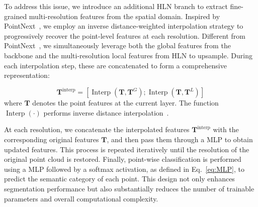 To address this issue, we introduce an additional HLN branch to extract fine-grained multi-resolution features from the spatial domain. Inspired by PointNext~\cite{qian2022pointnext}, we employ an inverse distance-weighted interpolation strategy to progressively recover the point-level features at each resolution. Different from PointNext~\cite{qian2022pointnext}, we simultaneously leverage both the global features from the backbone and the multi-resolution local features from HLN to upsample. During each interpolation step, these are concatenated to form a comprehensive representation:

\begin{equation}
\mathbf{T}^{\text{interp}} = [\operatorname{Interp}(\mathbf{T}, \mathbf{T}^G); \operatorname{Interp}(\mathbf{T}, \mathbf{T}^L)]
\end{equation}
where $\mathbf{T}$ denotes the point features at the current layer. The function $\operatorname{Interp}(\cdot)$ performs inverse distance interpolation~\cite{qian2022pointnext}.

At each resolution, we concatenate the interpolated features $\mathbf{T}^{\text{interp}}$ with the corresponding original features $\mathbf{T}$, and then pass them through a MLP to obtain updated features. This process is repeated iteratively until the resolution of the original point cloud is restored. Finally, point-wise classification is performed using a MLP followed by a softmax activation, as defined in Eq.~\eqref{eq:MLP}, to predict the semantic category of each point. This design not only enhances segmentation performance but also substantially reduces the number of trainable parameters and overall computational complexity.

